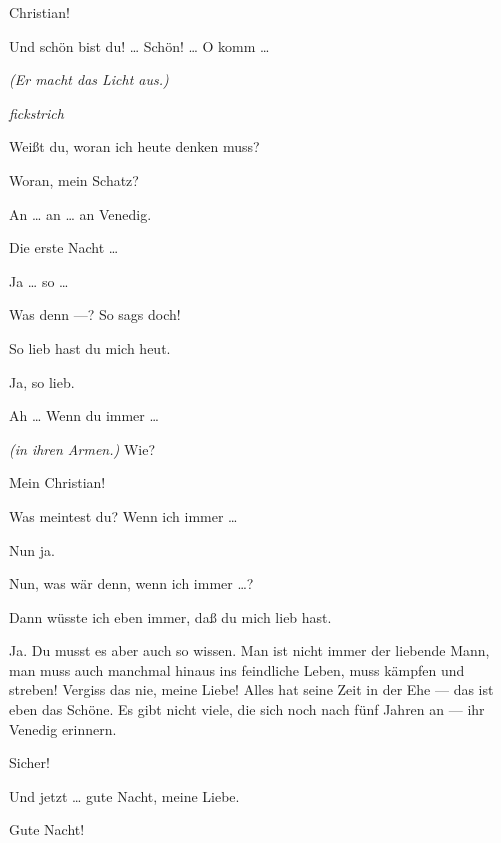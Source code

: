 \documentclass[
	final,
	a4paper,
	ngerman,
	mpinclude = true, %
	twoside = true,
	open = right,
	cleardoublepage = plain,
	DIV = 13,
	BCOR = 1cm,
	titlepage = firstiscover,
	]{scrbook}
\newcommand{\act}{\chapter}
\newcommand{\direction}[1]{\textit{(#1)}}
\newcommand{\hiat}{%
	\begin{center}
		\tiny
		\raisebox{0.5ex}{\rule{0.3\linewidth}{0.4pt}}
		\textit{fickstrich}
		\raisebox{0.5ex}{\rule{0.3\linewidth}{0.4pt}}
	\end{center}
}
\newcommand{\thecharacter}[1]{\textup{\textsc{#1}}\xspace}
\newcommand{\thefrau}{\thecharacter{Emma}}
\newcommand{\thegatte}{\thecharacter{Christian}}
\newcommand{\character}[1]{\item[#1:]}
\newcommand{\frau}{\character{\thefrau}}
\newcommand{\gatte}{\character{\thegatte}}
\begin{document}
\begin{play}
	\frau
	Christian!

	\gatte
	Und schön bist du! \ldots{} Schön! \ldots{} O komm \ldots{}

	\direction{Er macht das Licht aus.}

	\hiat

	\frau
	Weißt du, woran ich heute denken muss?

	\gatte
	Woran, mein Schatz?

	\frau
	An \ldots{} an \ldots{} an Venedig.

	\gatte
	Die erste Nacht \ldots{}

	\frau
	Ja \ldots{} so \ldots{}

	\gatte
	Was denn ---? So sags doch!

	\frau
	So lieb hast du mich heut.

	\gatte
	Ja, so lieb.

	\frau
	Ah \ldots{} Wenn du immer \ldots{}

	\gatte
	\direction{in ihren Armen.} Wie?

	\frau
	Mein Christian!

	\gatte
	Was meintest du? Wenn ich immer \ldots{}

	\frau
	Nun ja.

	\gatte
	Nun, was wär denn, wenn ich immer \ldots{}?

	\frau
	Dann wüsste ich eben immer, daß du mich lieb hast.

	\gatte
	Ja. Du musst es aber auch so wissen. Man ist nicht immer der liebende Mann, man muss auch manchmal hinaus ins feindliche Leben, muss kämpfen und streben! Vergiss das nie, meine Liebe! Alles hat seine Zeit in der Ehe --- das ist eben das Schöne. Es gibt nicht viele, die sich noch nach fünf Jahren an --- ihr Venedig erinnern.

	\frau
	Sicher!

	\gatte
	Und jetzt \ldots{} gute Nacht, meine Liebe.

	\frau
	Gute Nacht!

\end{play}


\end{document}
